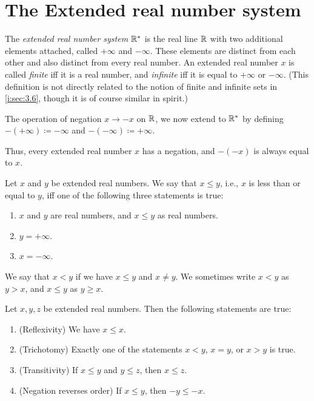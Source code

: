 \section{The Extended real number system}\label{i:sec:6.2}

\begin{defn}\label{i:6.2.1}
  The \emph{extended real number system \(\mathbb{R}^*\)} is the real line \(\mathbb{R}\) with two additional elements attached, called \(+\infty\) and \(-\infty\).
  These elements are distinct from each other and also distinct from every real number.
  An extended real number \(x\) is called \emph{finite} iff it is a real number, and \emph{infinite} iff it is equal to \(+\infty\) or \(-\infty\).
  (This definition is not directly related to the notion of finite and infinite sets in \cref{i:sec:3.6}, though it is of course similar in spirit.)
\end{defn}

\begin{defn}\label{i:6.2.2}
  The operation of negation \(x \to -x\) on \(\mathbb{R}\), we now extend to \(\mathbb{R}^*\) by defining \(-(+\infty) \coloneqq -\infty\) and \(-(-\infty) \coloneqq +\infty\).
\end{defn}

\begin{note}
  Thus, every extended real number \(x\) has a negation, and \(-(-x)\) is always equal to \(x\).
\end{note}

\begin{defn}\label{i:6.2.3}
  Let \(x\) and \(y\) be extended real numbers.
  We say that \(x \leq y\), i.e., \(x\) is less than or equal to \(y\), iff one of the following three statements is true:
  \begin{enumerate}
    \item \(x\) and \(y\) are real numbers, and \(x \leq y\) as real numbers.
    \item \(y = +\infty\).
    \item \(x = -\infty\).
  \end{enumerate}
  We say that \(x < y\) if we have \(x \leq y\) and \(x \neq y\).
  We sometimes write \(x < y\) as \(y > x\), and \(x \leq y\) as \(y \geq x\).
\end{defn}

\setcounter{thm}{4}
\begin{prop}\label{i:6.2.5}
  Let \(x, y, z\) be extended real numbers.
  Then the following statements are true:
  \begin{enumerate}
    \item (Reflexivity)
          We have \(x \leq x\).
    \item (Trichotomy)
          Exactly one of the statements \(x < y\), \(x = y\), or \(x > y\) is true.
    \item (Transitivity)
          If \(x \leq y\) and \(y \leq z\), then \(x \leq z\).
    \item (Negation reverses order) If \(x \leq y\), then \(-y \leq -x\).
  \end{enumerate}
\end{prop}

